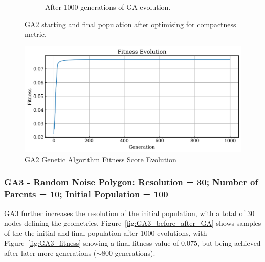 \documentclass{article}
\begin{document}
\begin{figure}[H]
\begin{subfigure}[b]{0.45\textwidth}
        \caption{After 1000 generations of GA evolution.}
        \label{fig:GA2_final}
    \end{subfigure}
    \caption{GA2 starting and final population after optimising for compactness metric.}
    \label{fig:GA2_before_after_GA}
\end{figure}

\begin{figure}[H]
    \centering
    \includegraphics[width=0.75\linewidth]{figures/GAResults/GA2/1000gens_10pars_100initpop_5pcent_mut.png}
    \caption{GA2 Genetic Algorithm Fitness Score Evolution}
    \label{fig:GA2_fitness}
\end{figure}



\subsubsection*{GA3 - Random Noise Polygon: Resolution = 30; Number of Parents = 10; Initial Population = 100}
GA3 further increases the resolution of the initial population, with a total of 30 nodes defining the geometries. Figure~\ref{fig:GA3_before_after_GA} shows samples of the the initial and final population after 1000 evolutions, with Figure~\ref{fig:GA3_fitness} showing a final fitness value of 0.075, but being achieved after later more generations ($\sim800$ generations).
\end{document}
